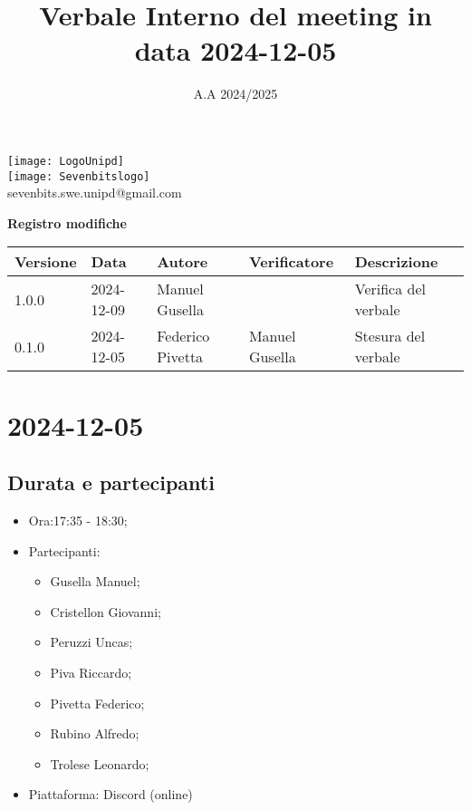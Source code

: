 \documentclass[10pt]{article}
\title{Verbale Interno del meeting in data 2024-12-05}
\date{A.A 2024/2025}
\begin{document}
\maketitle
\begin{center}
\texttt{[image: LogoUnipd]}\\
\texttt{[image: Sevenbitslogo]}\\
sevenbits.swe.unipd@gmail.com\\
\vspace{2mm}

\textbf{Registro modifiche}\\
\vspace{2mm}
\begin{tabularx}{\textwidth}{|l|l|l|l|X|}
\hline
\textbf{Versione} & \textbf{Data} & \textbf{Autore} & \textbf{Verificatore} & \textbf{Descrizione} \\
\hline
1.0.0 & 2024-12-09 & Manuel Gusella &  & Verifica del verbale\\
\hline
0.1.0 & 2024-12-05 & Federico Pivetta & Manuel Gusella & Stesura del verbale\\
\hline
\end{tabularx}
\end{center}

\newpage
\tableofcontents

\newpage
\section{2024-12-05}
\subsection{Durata e partecipanti}
\begin{itemize}
\item Ora:17:35 - 18:30;
\item Partecipanti: 	
	\begin{itemize}
	    \item Gusella Manuel;
            \item Cristellon Giovanni;
            \item Peruzzi Uncas;
            \item Piva Riccardo;
            \item Pivetta Federico;
            \item Rubino Alfredo;
            \item Trolese Leonardo;
	\end{itemize}
\item Piattaforma: Discord (online)
\end{itemize}
\end{document}
